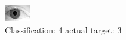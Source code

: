 \begin{figure}[h!]
\begin{center}
\includegraphics[width=0.60\columnwidth]{figures/ID2093_class_4_target_3.png}
\end{center}
\caption{ Classification: 4 actual target: 3}
\label{fig:ID2093_class_4_target_3}
\end{figure}
